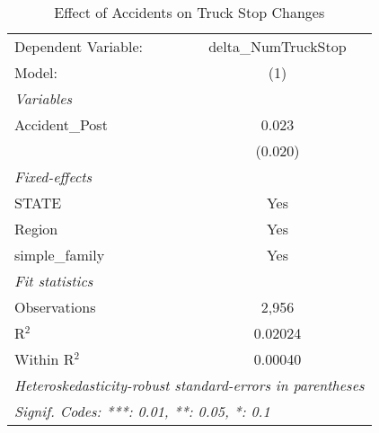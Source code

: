 
\begin{table}[htbp]
   \caption{Effect of Accidents on Truck Stop Changes}
   \centering
   \begin{tabular}{lc}
      \tabularnewline \midrule \midrule
      Dependent Variable: & delta\_NumTruckStop\\   
      Model:              & (1)\\  
      \midrule
      \emph{Variables}\\
      Accident\_Post      & 0.023\\   
                          & (0.020)\\   
      \midrule
      \emph{Fixed-effects}\\
      STATE               & Yes\\  
      Region              & Yes\\  
      simple\_family      & Yes\\  
      \midrule
      \emph{Fit statistics}\\
      Observations        & 2,956\\  
      R$^2$               & 0.02024\\  
      Within R$^2$        & 0.00040\\  
      \midrule \midrule
      \multicolumn{2}{l}{\emph{Heteroskedasticity-robust standard-errors in parentheses}}\\
      \multicolumn{2}{l}{\emph{Signif. Codes: ***: 0.01, **: 0.05, *: 0.1}}\\
   \end{tabular}
\end{table}


